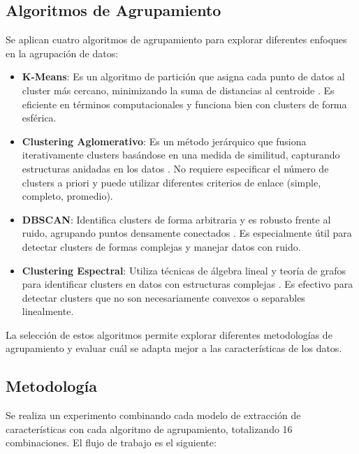 \subsection{Algoritmos de Agrupamiento}

Se aplican cuatro algoritmos de agrupamiento para explorar diferentes enfoques en la agrupación de datos:

\begin{itemize}
    \item \textbf{K-Means}: Es un algoritmo de partición que asigna cada punto de datos al cluster más cercano, minimizando la suma de distancias al centroide \cite{macqueen1967some}. Es eficiente en términos computacionales y funciona bien con clusters de forma esférica.
    \item \textbf{Clustering Aglomerativo}: Es un método jerárquico que fusiona iterativamente clusters basándose en una medida de similitud, capturando estructuras anidadas en los datos \cite{rokach2005clustering}.
    No requiere especificar el número de clusters a priori y puede utilizar diferentes criterios de enlace (simple, completo, promedio).
    \item \textbf{DBSCAN}: Identifica clusters de forma arbitraria y es robusto frente al ruido, agrupando puntos densamente conectados \cite{ester1996density}.
    Es especialmente útil para detectar clusters de formas complejas y manejar datos con ruido.
    \item \textbf{Clustering Espectral}: Utiliza técnicas de álgebra lineal y teoría de grafos para identificar clusters en datos con estructuras complejas \cite{ng2002spectral}.
    Es efectivo para detectar clusters que no son necesariamente convexos o separables linealmente.
\end{itemize}

La selección de estos algoritmos permite explorar diferentes metodologías de agrupamiento y evaluar cuál se adapta mejor a las características de los datos.

\subsection{Metodología}

Se realiza un experimento combinando cada modelo de extracción de características con cada algoritmo de agrupamiento, totalizando 16 combinaciones.
El flujo de trabajo es el siguiente:

